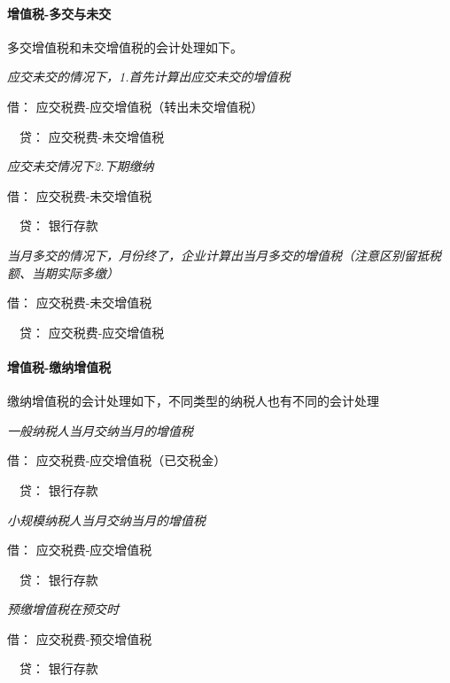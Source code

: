 \documentclass[UTF8,12pt]{ctexart}
\newenvironment{Dr}{\noindent 借：}{\par}
\newenvironment{Cr}{\noindent \ \ 贷：}{\par}
\numberwithin{equation}{section} %
\numberwithin{figure}{section}
\numberwithin{table}{section}
\begin{document}
	\paragraph{增值税-多交与未交}多交增值税和未交增值税的会计处理如下。
	
	\textit{应交未交的情况下，1.首先计算出应交未交的增值税}
	
	\begin{Dr}
		应交税费-应交增值税（转出未交增值税）
	\end{Dr}
	\begin{Cr}
		应交税费-未交增值税
	\end{Cr}
	
	\textit{应交未交情况下2.下期缴纳}
	
	\begin{Dr}
		应交税费-未交增值税
	\end{Dr}
	\begin{Cr}
		银行存款
	\end{Cr}

	\textit{当月多交的情况下，月份终了，企业计算出当月多交的增值税（注意区别留抵税额、当期实际多缴）}
	
	\begin{Dr}
		应交税费-未交增值税
	\end{Dr}
	\begin{Cr}
		应交税费-应交增值税
	\end{Cr}

	\paragraph{增值税-缴纳增值税}缴纳增值税的会计处理如下，不同类型的纳税人也有不同的会计处理
	
	\textit{一般纳税人当月交纳当月的增值税}
	
	\begin{Dr}
		应交税费-应交增值税（已交税金）
	\end{Dr}
	\begin{Cr}
		银行存款
	\end{Cr}

	\textit{小规模纳税人当月交纳当月的增值税}
	
	\begin{Dr}
		应交税费-应交增值税
	\end{Dr}
	\begin{Cr}
		银行存款
	\end{Cr}

	\textit{预缴增值税在预交时}
	
	\begin{Dr}
		应交税费-预交增值税
	\end{Dr}
	\begin{Cr}
		银行存款
	\end{Cr}
\end{document}
